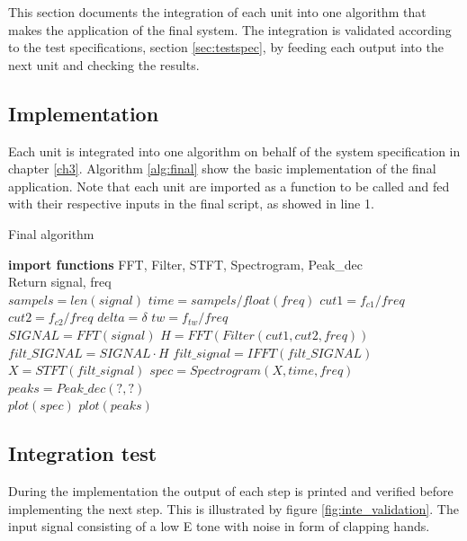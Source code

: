 This section documents the integration of each unit into one algorithm that makes the application of the final system. The integration is validated according to the test specifications, section \ref{sec:testspec}, by feeding each output into the next unit and checking the results. 

\subsection{Implementation}
Each unit is integrated into one algorithm on behalf of the system specification in chapter \ref{ch3}. Algorithm \ref{alg:final} show the basic implementation of the final application. Note that each unit are imported as a function to be called and fed with their respective inputs in the final script, as showed in line 1.
\begin{algorithm}[H]
\caption{Final algorithm}
\begin{algorithmic}[1]
\State \textbf{import functions} FFT, Filter, STFT, Spectrogram, Peak\_dec  
\\
\State Return signal, freq 
\EndProcedure 
\\
\State $sampels = len(signal)$ 
\State $time   = sampels/float(freq)$
\State $cut1 = f_{c1}/freq$ 
\State $cut2 = f_{c2}/freq$
\State $delta = \delta$
\State $tw = f_{tw}/freq$
\\
\State $SIGNAL = FFT(signal) $
\State $H = FFT(Filter(cut1,cut2,freq))$
\State $filt\_SIGNAL = SIGNAL \cdot H$
\State $filt\_signal = IFFT(filt\_SIGNAL)$  
\EndProcedure 
\\
\State $X = STFT(filt\_signal)$
\State $spec = Spectrogram(X,time,freq)$
\State $peaks = Peak\_dec(?,?)$
\EndProcedure
\\
\State $plot(spec)$ 
\State $plot(peaks)$
\EndProcedure
\end{algorithmic}
\label{alg:final}
\end{algorithm}      

\subsection{Integration test}
During the implementation the output of each step is printed and verified before implementing the next step. This is illustrated by figure \ref{fig:inte_validation}. The input signal consisting of a low E tone with noise in form of clapping hands.  

